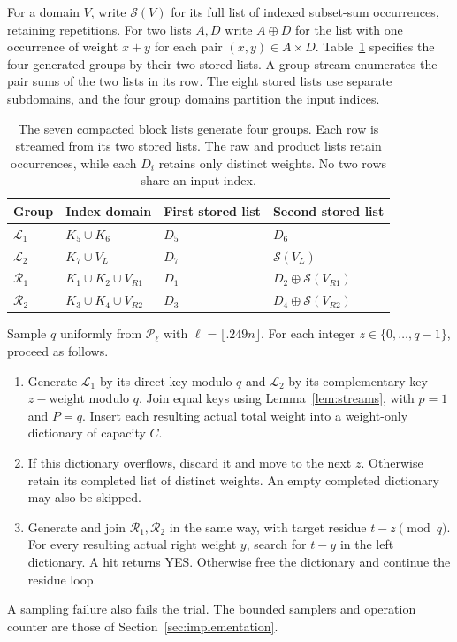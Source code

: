 For a domain $V$, write $\mathcal S(V)$ for its full list of indexed
subset-sum occurrences, retaining repetitions. For two lists $A,D$
write $A\oplus D$ for the list with one occurrence of weight $x+y$
for each pair $(x,y)\in A\times D$. Table~\ref{tab:compression}
specifies the four generated groups by their two stored lists.
A group stream enumerates the pair sums of the two lists in its row.
The eight stored lists use separate subdomains, and the four group
domains partition the input indices.

\begin{table}[htbp]
\centering
\begin{tabular}{@{}llll@{}}
\toprule
Group & Index domain & First stored list & Second stored list\\
\midrule
$\mathcal L_1$ & $K_5\cup K_6$ & $D_5$ & $D_6$\\
$\mathcal L_2$ & $K_7\cup V_L$ & $D_7$ & $\mathcal S(V_L)$\\
$\mathcal R_1$ & $K_1\cup K_2\cup V_{R1}$ & $D_1$
 & $D_2\oplus\mathcal S(V_{R1})$\\
$\mathcal R_2$ & $K_3\cup K_4\cup V_{R2}$ & $D_3$
 & $D_4\oplus\mathcal S(V_{R2})$\\
\bottomrule
\end{tabular}
\caption{The seven compacted block lists generate four groups. Each
row is streamed from its two stored lists. The raw and product lists
retain occurrences, while each $D_i$ retains only distinct weights.
No two rows share an input index.}
\label{tab:compression}
\end{table}

Sample $q$ uniformly from $\mathcal P_\ell$ with
$\ell=\lfloor .249n\rfloor$. For each integer
$z\in\{0,\ldots,q-1\}$, proceed as follows.
\begin{enumerate}
\item Generate $\mathcal L_1$ by its direct key modulo $q$ and
$\mathcal L_2$ by its complementary key $z-\text{weight}$
modulo $q$. Join equal keys using Lemma~\ref{lem:streams}, with
$p=1$ and $P=q$. Insert each resulting actual total weight into
a weight-only dictionary of capacity $C$.
\item If this dictionary overflows, discard it and move to the next
$z$. Otherwise retain its completed list of distinct weights.
An empty completed dictionary may also be skipped.
\item Generate and join $\mathcal R_1,\mathcal R_2$ in the same
way, with target residue $t-z\pmod q$. For every resulting actual
right weight $y$, search for $t-y$ in the left dictionary. A hit
returns YES. Otherwise free the dictionary and continue the residue
loop.
\end{enumerate}
A sampling failure also fails the trial. The bounded samplers and
operation counter are those of Section~\ref{sec:implementation}.

